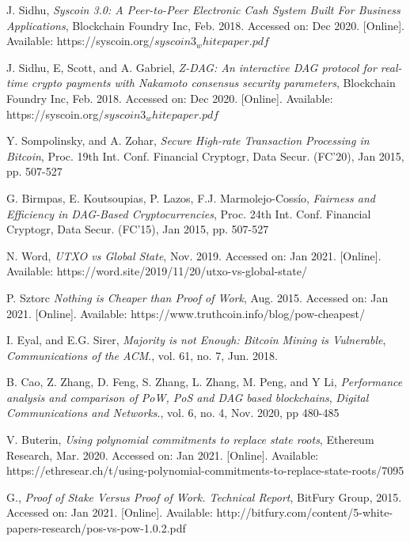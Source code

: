 \documentclass[peerreview]{ieeesyscoin}
\begin{document}
\begin{thebibliography}{00}


 J. Sidhu, \textit{Syscoin 3.0: A Peer-to-Peer Electronic Cash System Built For Business Applications}, Blockchain Foundry Inc, Feb. 2018. Accessed on: Dec 2020. [Online]. Available: https://syscoin.org/$syscoin3_whitepaper.pdf$

 J. Sidhu, E, Scott, and A. Gabriel, \textit{Z-DAG: An interactive DAG protocol for real-time crypto payments with Nakamoto consensus security parameters}, Blockchain Foundry Inc, Feb. 2018. Accessed on: Dec 2020. [Online]. Available: https://syscoin.org/$syscoin3_whitepaper.pdf$


 Y. Sompolinsky, and A. Zohar, \textit{Secure High-rate Transaction Processing in Bitcoin}, Proc. 19th Int. Conf. Financial Cryptogr, Data Secur. (FC’20), Jan 2015, pp. 507-527

 G. Birmpas, E. Koutsoupias, P. Lazos, F.J. Marmolejo-Cossío, \textit{Fairness and Efficiency in DAG-Based Cryptocurrencies}, Proc. 24th Int. Conf. Financial Cryptogr, Data Secur. (FC’15), Jan 2015, pp. 507-527


 N. Word, \textit{UTXO vs Global State}, Nov. 2019. Accessed on: Jan 2021. [Online]. Available: https://word.site/2019/11/20/utxo-vs-global-state/

 P. Sztorc \textit{Nothing is Cheaper than Proof of Work}, Aug. 2015. Accessed on: Jan 2021. [Online]. Available: https://www.truthcoin.info/blog/pow-cheapest/

 I. Eyal, and E.G. Sirer, \textit{Majority is not Enough: Bitcoin Mining is Vulnerable}, \emph{Communications of the ACM}., vol. 61, no. 7, Jun. 2018.

 B. Cao, Z. Zhang, D. Feng, S. Zhang, L. Zhang, M. Peng, and
Y Li, \textit{Performance analysis and comparison of PoW, PoS and DAG based blockchains}, \emph{Digital Communications and Networks}., vol. 6, no. 4, Nov. 2020, pp 480-485

 V. Buterin, \textit{Using polynomial commitments to replace state roots}, Ethereum Research, Mar. 2020. Accessed on: Jan 2021. [Online]. Available: https://ethresear.ch/t/using-polynomial-commitments-to-replace-state-roots/7095

 G., \textit{Proof of Stake Versus Proof of Work. Technical Report}, BitFury Group, 2015. Accessed on: Jan 2021. [Online]. Available: http://bitfury.com/content/5-white-papers-research/pos-vs-pow-1.0.2.pdf 


\end{thebibliography}
\end{document}
